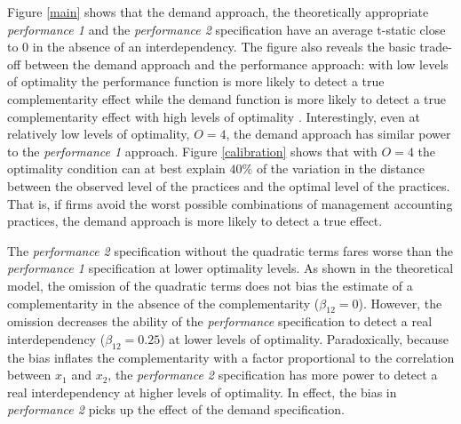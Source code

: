 \documentclass[12pt]{article}
\begin{document}
Figure \ref{main} shows that the demand approach, the theoretically appropriate \emph{performance 1} and the \emph{performance 2} specification have an average t-static close to 0 in the absence of an interdependency. The figure also reveals the basic trade-off between the demand approach and the performance approach: with low levels of optimality the performance function is more likely to detect a true complementarity effect while the demand function is more likely to detect a true complementarity effect with high levels of optimality \citep{Grabner2013, Aral2012,Johansson2018}. Interestingly, even at relatively low levels of optimality, \(O = 4\), the demand approach has similar power to the \emph{performance 1} approach. Figure \ref{calibration} shows that with $O=4$ the optimality condition can at best explain $40\%$ of the variation in the distance between the observed level of the practices and the optimal level of the practices. That is, if firms avoid the worst possible combinations of management accounting practices, the demand approach is more likely to detect a true effect.

The \emph{performance 2} specification without the quadratic terms fares worse than the \emph{performance 1} specification at lower optimality levels. As shown in the theoretical model, the omission of the quadratic terms does not bias the estimate of a complementarity in the absence of the complementarity ($\beta_{12} = 0$).  However, the omission decreases the ability of the \emph{performance} specification to detect a real interdependency ($\beta_{12} = 0.25$) at lower levels of optimality. Paradoxically, because the bias inflates the complementarity with a factor proportional to the correlation between $x_1$ and $x_2$, the \emph{performance 2} specification has more power to detect a real interdependency at higher levels of optimality. In effect, the bias in \emph{performance 2} picks up the effect of the demand specification.
\end{document}
